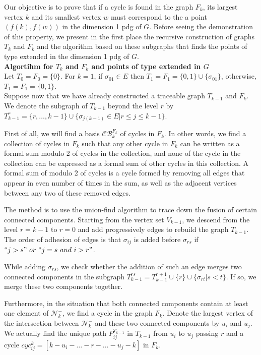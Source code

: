 \documentclass[a4paper,12pt]{article}
\numberwithin{equation}{section}
\begin{document}
	Our objective is to prove that if a cycle is found in the graph $F_k$, its largest vertex $k$ and its smallest vertex $w$ must correspond to the a point $(f(k), f(w))$ in the dimension 1 pdg of $G$. Before seeing the demonstration of this property, we present in the first place the recursive construction of graphs $T_k$ and $F_{k}$ and the algorithm based on these subgraphs that finds the points of type extended in the dimension 1 pdg of $G$.\\
	
	
	\newpage
	\noindent \textbf{Algortihm for $T_k$ and $F_k$ and points of type extended in $G$}\\
	
	Let $T_0 = F_0 = \{0\}$. For $k=1$, if $\sigma_{01} \in E$ then $T_1 = F_1 = \{0,1\} \cup \{\sigma_{01} \}$, otherwise, $T_1 = F_1 = \{0,1\}$.\\
	
	Suppose now that we have already constructed a traceable graph $T_{k-1}$ and $F_k$. We denote the subgraph of $T_{k-1}$ beyond the level $r$ by $T^r_{k-1} = \{r,\ldots,k-1\} \cup \{ \sigma_{j(k-1)} \in E \vert r \leq j \leq k-1 \}$.
	
	First of all, we will find a basis $\mathcal{CB}^{F_k}_k$ of cycles in $F_k$. In other words, we find a collection of cycles in $F_k$ such that any other cycle in $F_k$ can be written as a formal sum modulo 2 of cycles in the collection, and none of the cycle in the collection can be expressed as a formal sum of other cycles in this collection. A formal sum of modulo 2 of cycles is a cycle formed by removing all edges that appear in even number of times in the sum, as well as the adjacent vertices between any two of these removed edges. 
	
	The method is to use the union-find algorithm to trace down the fusion of certain connected components. Starting from the vertex set $V_{k-1}$, we descend from the level $r = k-1$ to $r = 0$ and add progressively edges to rebuild the graph $T_{k-1}$. The order of adhesion of edges is that $\sigma_{ij}$ is added before $\sigma_{rs}$ if $``j > s" \  or \  ``j=s \  and \  i > r"$.
	
	While adding $\sigma_{rs}$, we check whether the addition of such an edge merges two connected components in the subgraph $T^{rs}_{k-1} = T^{r+1}_{k-1} \cup \{r\} \cup \{ \sigma_{rt} \vert s < t\}$. If so, we merge these two components together. 
	
	Furthermore, in the situation that both connected components contain at least one element of $\mathcal{N}_k^-$, we find a cycle in the graph $F_k$. Denote the largest vertex of the intersection between $\mathcal{N}_k^-$ and these two connected components by $u_i$ and $u_j$. We actually find the unique path $P_{ij}^{T_{k-1}}$ in $T_{k-1}$ from $u_i$ to $u_j$ passing $r$ and a cycle $cyc^{k}_{ij} = [k - u_i -\ldots -r - \ldots - u_j - k]$ in $F_k$. 
	
\end{document}
